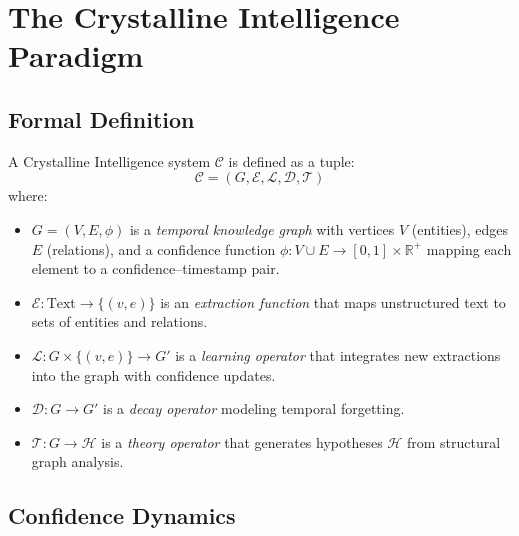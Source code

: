 \documentclass[11pt,twocolumn]{article}
\begin{document}
\section{The Crystalline Intelligence Paradigm}
\label{sec:paradigm}

\subsection{Formal Definition}

A Crystalline Intelligence system $\mathcal{C}$ is defined as a tuple:
\begin{equation}
  \mathcal{C} = (G, \mathcal{E}, \mathcal{L}, \mathcal{D}, \mathcal{T})
\end{equation}
where:
\begin{itemize}
  \item $G = (V, E, \phi)$ is a \emph{temporal knowledge graph} with vertices $V$ (entities), edges $E$ (relations), and a confidence function $\phi: V \cup E \rightarrow [0,1] \times \mathbb{R}^+$ mapping each element to a confidence--timestamp pair.
  \item $\mathcal{E}: \text{Text} \rightarrow \{(v, e)\}$ is an \emph{extraction function} that maps unstructured text to sets of entities and relations.
  \item $\mathcal{L}: G \times \{(v,e)\} \rightarrow G'$ is a \emph{learning operator} that integrates new extractions into the graph with confidence updates.
  \item $\mathcal{D}: G \rightarrow G'$ is a \emph{decay operator} modeling temporal forgetting.
  \item $\mathcal{T}: G \rightarrow \mathcal{H}$ is a \emph{theory operator} that generates hypotheses $\mathcal{H}$ from structural graph analysis.
\end{itemize}

\subsection{Confidence Dynamics}
\end{document}
